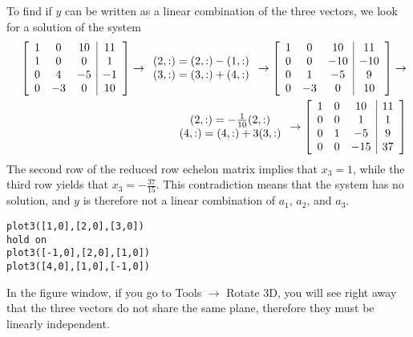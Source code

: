 To find if $y$ can be written as a linear combination of the three vectors, we look for a solution of the system
\begin{eqnarray*}
&&\left[\begin{array}{ccc|c}1&0&10&11 \\ 1&0&0&1 \\ 0&4&-5&-1 \\ 0&-3&0&10\end{array}\right]\rightarrow \begin{array}{c}(2,:)=(2,:)-(1,:)\\(3,:)=(3,:)+(4,:)\end{array}\rightarrow
\left[\begin{array}{ccc|c}1&0&10&11 \\ 0&0&-10&-10 \\ 0&1&-5&9 \\ 0&-3&0&10\end{array}\right]\rightarrow\\
&&\begin{array}{c}(2,:)=-\frac{1}{10}(2,:)\\(4,:)=(4,:)+3(3,:)\end{array}\rightarrow
\left[\begin{array}{ccc|c}1&0&10&11 \\ 0&0&1&1 \\ 0&1&-5&9 \\ 0&0&-15&37\end{array}\right]
\end{eqnarray*}
The second row of the reduced row echelon matrix implies that $x_3=1$, while the third row yields that $x_3 = -\frac{37}{15}$. This contradiction means that the system has no solution, and $y$ is therefore not a linear combination of $a_1$, $a_2$, and $a_3$.

\vspace{2mm}
\begin{verbatim}
plot3([1,0],[2,0],[3,0])
hold on
plot3([-1,0],[2,0],[1,0])
plot3([4,0],[1,0],[-1,0])
\end{verbatim}
In the figure window, if you go to Tools $\rightarrow$ Rotate 3D, you will see right away that the three vectors do not share the same plane, therefore they must be linearly independent.

